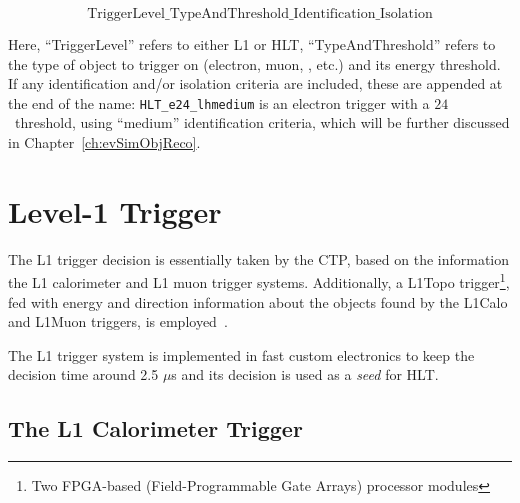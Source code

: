 		$$\mathrm{TriggerLevel\_TypeAndThreshold\_Identification\_Isolation}$$

		\noindent Here, ``TriggerLevel'' refers to either \ac{L1} or \ac{HLT}, ``TypeAndThreshold'' refers to the type of object to trigger on (electron, muon, \met, etc.) and its energy threshold. If any identification and/or isolation criteria are included, these are appended at the end of the name: \texttt{HLT\_e24\_lhmedium} is an electron trigger with a $24$ \GeV\ threshold, using ``medium'' identification criteria, which will be further discussed in Chapter~\ref{ch:evSimObjReco}. 



		
	\section{Level-1 Trigger}
	\label{sec:L1}

		The \ac{L1} trigger decision is essentially taken by the \ac{CTP}, based on the information the \ac{L1} calorimeter and \ac{L1} muon trigger systems. Additionally, a \ac{L1Topo} trigger\footnote{Two FPGA-based (Field-Programmable Gate Arrays) processor modules}, fed with energy and direction information about the objects found by the \ac{L1Calo} and \ac{L1Muon} triggers, is employed~\cite{ATLASJINST,ATLASTrigger2015,ATLASL1Topo}.

		The \ac{L1} trigger system is implemented in fast custom electronics to keep the decision time around 2.5 $\mu$s and its decision is used as a \emph{seed} for \ac{HLT}. 


		\subsection*{The L1 Calorimeter Trigger}

